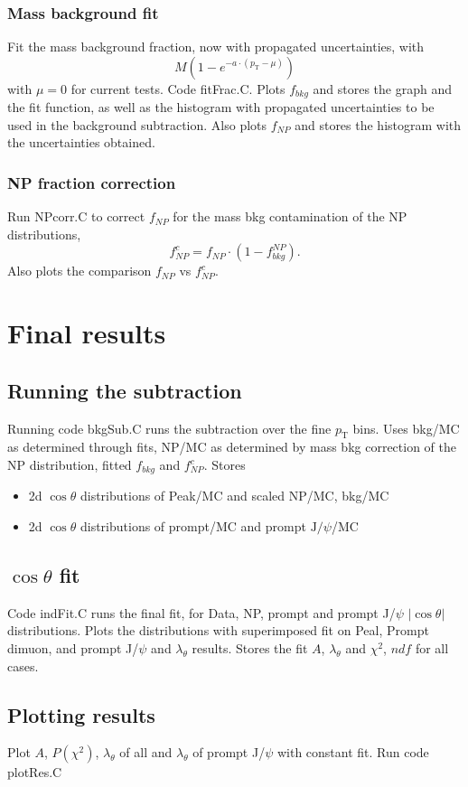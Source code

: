 \documentclass{article}
\newcommand{\pt}{p_\text{T}}
\newcommand{\cost}{\cos\theta}
\newcommand{\jpsi}{\text{J}/\psi}
\begin{document}
\subsubsection{Mass background fit}

Fit the mass background fraction, now with propagated uncertainties, with 
\begin{equation}
M\left(1-e^{-a\cdot(\pt-\mu)}\right)
\end{equation}
with $\mu=0$ for current tests. Code fitFrac.C. Plots $f_{bkg}$ and stores the graph and the fit function, as well as the histogram with propagated uncertainties to be used in the background subtraction. Also plots $f_{NP}$ and stores the histogram with the uncertainties obtained.

\subsubsection{NP fraction correction}

Run NPcorr.C to correct $f_{NP}$ for the mass bkg contamination of the NP distributions,
\begin{equation}
f_{NP}^c = f_{NP}\cdot\left(1-f_{bkg}^{NP}\right).
\end{equation}
Also plots the comparison $f_{NP}$ vs $f_{NP}^c$.

\pagebreak

\section{Final results}

\subsection{Running the subtraction}

Running code bkgSub.C runs the subtraction over the fine $\pt$ bins. Uses bkg/MC as determined through fits, NP/MC as determined by mass bkg correction of the NP distribution, fitted $f_{bkg}$ and $f_{NP}^c$. Stores
\begin{itemize}
\item 2d $\cost$ distributions of Peak/MC and scaled NP/MC, bkg/MC
\item 2d $\cost$ distributions of prompt/MC and prompt $\jpsi$/MC
\end{itemize}

\subsection{$\cost$ fit}

Code indFit.C runs the final fit, for  Data, NP, prompt and prompt J/$\psi$ $|\cost|$ distributions. Plots the distributions with superimposed fit on Peal, Prompt dimuon, and prompt J/$\psi$ and $\lambda_\theta$ results. Stores the fit $A$, $\lambda_\theta$ and $\chi^2$, $ndf$ for all cases. 

\subsection{Plotting results}

Plot $A$, $P(\chi^2)$, $\lambda_\theta$ of all and $\lambda_\theta$ of prompt J/$\psi$ with constant fit. Run code plotRes.C
\end{document}
